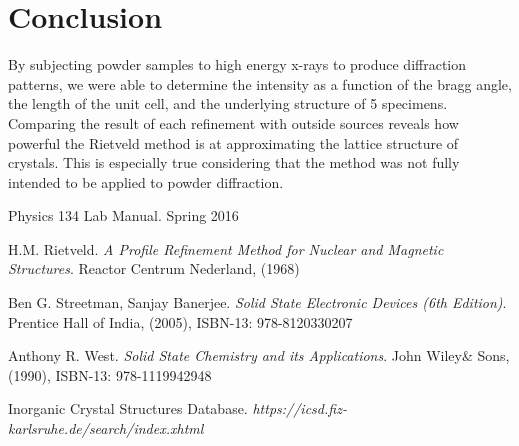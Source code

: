 \documentclass[12pt]{article}
\begin{document}
\section{Conclusion}
By subjecting powder samples to high energy x-rays to produce diffraction patterns, we were able to determine the intensity as a function of the bragg angle, the length of the unit cell, and the underlying structure of 5 specimens. Comparing the result of each refinement with outside sources reveals how powerful the Rietveld method is at approximating the lattice structure of crystals. This is especially true considering that the method was not fully intended to be applied to powder diffraction.









\newpage
\begin{thebibliography}{9}

Physics 134 Lab Manual. Spring 2016

H.M. Rietveld.
\textit{A Profile Refinement Method for Nuclear and Magnetic Structures}. Reactor Centrum Nederland, (1968)

Ben G. Streetman, Sanjay Banerjee.
\textit{Solid State Electronic Devices (6th Edition)}. Prentice Hall of India, (2005), ISBN-13: 978-8120330207

Anthony R. West.
\textit{Solid State Chemistry and its Applications}. John Wiley\& Sons, (1990),  ISBN-13: 978-1119942948

 Inorganic Crystal Structures Database. \textit{https://icsd.fiz-karlsruhe.de/search/index.xhtml}

\end{thebibliography}
\end{document}
